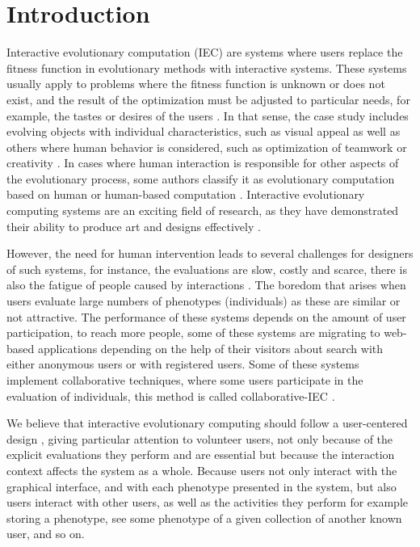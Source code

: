 \chapter{Introduction} \label{introduction}


\par Interactive evolutionary computation (IEC) are systems where users replace the
fitness function in evolutionary methods with interactive
systems\cite{eiben2015introduction}. These systems usually apply to problems
where the fitness function is unknown or does not exist, and the result of the
optimization must be adjusted to particular needs, for example, the tastes or
desires of the users . In that sense, the case study includes evolving objects
with individual characteristics, such as visual appeal as well as others where
human behavior is considered, such as optimization of teamwork
\cite{kosorukoff2002evolutionary} or creativity \cite{yu2011cooks}. In cases
where human interaction is   responsible for other aspects of the evolutionary
process, some authors classify it as evolutionary computation based on human
\cite{kosorukoff2001human} or human-based computation \cite{quinn2011human}.
Interactive evolutionary computing systems are an exciting field of research, as
they have demonstrated their ability to produce art and designs effectively
\cite{bentley1999introduction, kowaliw2012promoting, sims1991artificial,
todd1994evolutionary}.

\par However, the need for human intervention leads to several challenges for
designers of such systems, for instance, the evaluations are slow, costly and
scarce, there is also the fatigue of people caused by interactions
\cite{takagi1998interactive}. The boredom that arises when users evaluate large
numbers of phenotypes (individuals) as these are similar or not attractive. The
performance of these systems depends on the amount of user participation, to
reach more people, some of these systems are migrating to web-based applications
depending on the help of their visitors about search with either anonymous users
or with registered users. Some of these systems implement collaborative
techniques, where some users participate in the evaluation of individuals, this
method is called collaborative-IEC \cite{secretan2008picbreeder,
seyama2016development, wagy2014collective}.

\par We believe that interactive evolutionary computing should follow a user-centered
design \cite{greenhouse2012human}, giving particular attention to volunteer
users, not only because of the explicit evaluations they perform and are
essential but because the interaction context affects the system as a whole.
Because users not only interact with the graphical interface, and with each
phenotype presented in the system, but also users interact with other users, as
well as the activities they perform for example storing a phenotype, see some
phenotype of a given collection of another known user, and so on.

